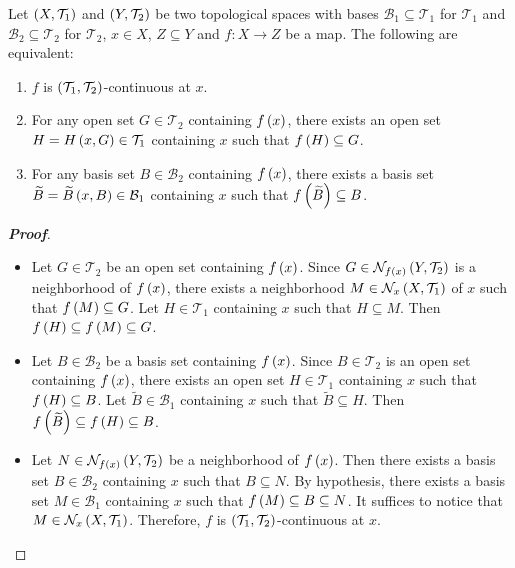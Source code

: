 \begin{proposition}
  Let $\left(X,\mathcal{T}_1\right)$ and $\left(Y,\mathcal{T}_2\right)$ be two topological spaces with bases $\mathcal{B}_1\subseteq\mathcal{T}_1$ for $\mathcal{T}_1$ and $\mathcal{B}_2\subseteq\mathcal{T}_2$ for $\mathcal{T}_2$, $x\in X$, $Z\subseteq Y$ and $f:X\rightarrow Z$ be a map. The following are equivalent:
  
  \begin{enumerate}
    \item $f$ is  $\left(\mathcal{T}_1,\mathcal{T}_2\right)$-continuous at $x$.
    \item For any open set $G\in\mathcal{T}_2$ containing $f\left(x\right)$, there exists an open set $H=H\left(x,G\right)\in\mathcal{T}_1$ containing $x$ such that $f\left(H\right)\subseteq G$.
    \item For any basis set $B\in\mathcal{B}_2$ containing $f\left(x\right)$, there exists a basis set $\widetilde{B}=\widetilde{B}\left(x,B\right)\in\mathcal{B}_1$ containing $x$ such that $f\left(\widetilde{B}\right)\subseteq B$.
  \end{enumerate}
  \begin{proof}[\rm\textbf{Proof}]
    \hfill
    \begin{itemize}
      \item[\boxed{1\Rightarrow2}] Let $G\in\mathcal{T}_2$ be an open set containing $f\left(x\right)$. Since $G\in\mathcal{N}_{f\left(x\right)}\left(Y,\mathcal{T}_2\right)$ is a neighborhood of $f\left(x\right)$, there exists a neighborhood $M\in\mathcal{N}_x\left(X,\mathcal{T}_1\right)$ of $x$ such that $f\left(M\right)\subseteq G$. Let $H\in\mathcal{T}_1$ containing $x$ such that $H\subseteq M$. Then $f\left(H\right)\subseteq f\left(M\right)\subseteq G$.
      \item[\boxed{2\Rightarrow3}] Let $B\in\mathcal{B}_2$ be a basis set containing $f\left(x\right)$. Since $B\in\mathcal{T}_2$ is an open set containing $f\left(x\right)$, there exists an open set $H\in\mathcal{T}_1$ containing $x$ such that $f\left(H\right)\subseteq B$. Let $\widetilde{B}\in\mathcal{B}_1$ containing $x$ such that $\widetilde{B}\subseteq H$. Then $f\left(\widetilde{B}\right)\subseteq f\left(H\right)\subseteq B$.
      \item[\boxed{3\Rightarrow1}] Let $N\in\mathcal{N}_{f\left(x\right)}\left(Y,\mathcal{T}_2\right)$ be a neighborhood of $f\left(x\right)$. Then there exists a basis set $B\in\mathcal{B}_2$ containing $x$ such that $B\subseteq N$. By hypothesis, there exists a basis set $M\in\mathcal{B}_1$ containing $x$ such that $f\left(M\right)\subseteq B\subseteq N$. It suffices to notice that $M\in\mathcal{N}_x\left(X,\mathcal{T}_1\right)$. Therefore, $f$ is $\left(\mathcal{T}_1,\mathcal{T}_2\right)$-continuous at $x$.
    \end{itemize}
  \end{proof}
\end{proposition}
  
